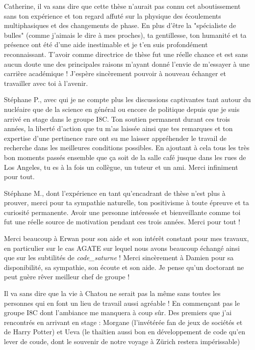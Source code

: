 \npar
Catherine, il va sans dire que cette thèse n'aurait pas connu cet aboutissement sans ton expérience et ton regard affuté sur la physique des écoulements multiphasiques et des changements de phase. En plus d'être la "spécialiste de bulles" (comme j'aimais le dire à mes proches), ta gentillesse, ton humanité et ta présence ont été d'une aide inestimable et je t'en suis profondément reconnaissant. T'avoir comme directrice de thèse fut une réelle chance et est sans aucun doute une des principales raisons m'ayant donné l'envie de m'essayer à une carrière académique ! J'espère sincèrement pouvoir à nouveau échanger et travailler avec toi à l'avenir.

\npar

Stéphane P., avec qui je ne compte plus les discussions captivantes tant autour du nucléaire que de la science en général ou encore de politique depuis que je suis arrivé en stage dans le groupe I8C.  Ton soutien permanent durant ces trois années, la liberté d'action que tu m'as laissée ainsi que tes remarques et ton expertise d'une pertinence rare ont su me laisser appréhender le travail de recherche dans les meilleures conditions possibles. En ajoutant à cela tous les très bon moments passés ensemble que ça soit de la salle café jusque dans les rues de Los Angeles, tu es à la fois un collègue, un tuteur et un ami. Merci infiniment pour tout.

\npar

Stéphane M., dont l'expérience en tant qu'encadrant de thèse n'est plus à prouver, merci pour ta sympathie naturelle, ton positivisme à toute épreuve et ta curiosité permanente. Avoir une personne intéressée et bienveillante comme toi fut une réelle source de motivation pendant ces trois années. Merci pour tout !

\npar

Merci beaucoup à Erwan pour son aide et son intérêt constant pour mes travaux, en particulier sur le cas AGATE sur lequel nous avons beaucoup échangé ainsi que sur les subtilités de \textit{code\_saturne} ! Merci sincèrement à Damien pour sa disponibilité, sa sympathie, son écoute et son aide. Je pense qu'un doctorant ne peut guère rêver meilleur chef de groupe !

\npar

Il va sans dire que la vie à Chatou ne serait pas la même sans toutes les personnes qui en font un lieu de travail aussi agréable ! En commençant pas le groupe I8C dont l'ambiance me manquera à coup sûr. Des premiers que j'ai rencontrés en arrivant en stage : Morgane (l'invétérée fan de jeux de sociétés et de Harry Potter) et Ueva (le thaïtien aussi bon en développement de code qu'en lever de coude, dont le souvenir de notre voyage à Zürich restera impérissable)

